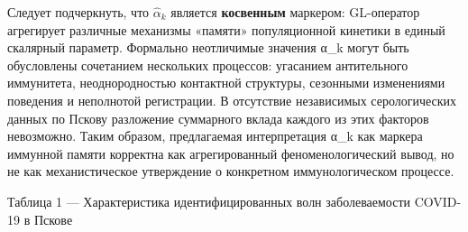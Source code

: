 \documentclass[12pt]{article}
\begin{document}
Следует подчеркнуть, что \(\hat{\alpha}_k\) является \textbf{косвенным}
маркером: GL-оператор агрегирует различные механизмы «памяти»
популяционной кинетики в единый скалярный параметр. Формально
неотличимые значения α\_k могут быть обусловлены сочетанием нескольких
процессов: угасанием антительного иммунитета, неоднородностью контактной
структуры, сезонными изменениями поведения и неполнотой регистрации. В
отсутствие независимых серологических данных по Пскову разложение
суммарного вклада каждого из этих факторов невозможно. Таким образом,
предлагаемая интерпретация α\_k как маркера иммунной памяти корректна
как агрегированный феноменологический вывод, но не как механистическое
утверждение о конкретном иммунологическом процессе.

Таблица 1 --- Характеристика идентифицированных волн заболеваемости
COVID-19 в Пскове
\end{document}

